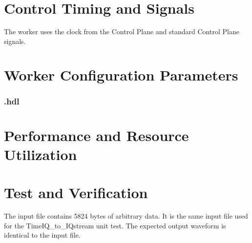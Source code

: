 \section*{Control Timing and Signals}
\begin{flushleft}
	The \comp worker{} uses the clock from the Control Plane and standard Control Plane signals.\\
\end{flushleft}

\begin{landscape}
\section*{Worker Configuration Parameters}
\subsubsection*{\comp.hdl}
%
\section*{Performance and Resource Utilization}
%
\end{landscape}

\section*{Test and Verification}
\begin{flushleft}
	The input file contains 5824 bytes of arbitrary data. It is the same input file used for the TimeIQ\_to\_IQstream unit test. The expected output waveform is identical to the input file.
\end{flushleft}

